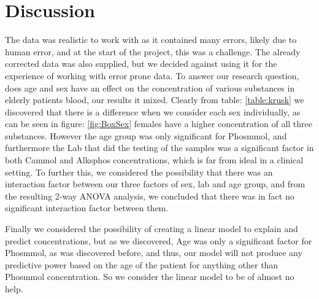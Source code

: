 \documentclass{article}
\begin{document}
  \section{Discussion}
    The data was realistic to work with as it contained many errors, likely due to human error, and at the start of the project, this was a challenge.
    The already corrected data was also supplied, but we decided against using it for the experience of working with error prone data.
    To answer our research question, does age and sex have an effect on the concentration of various substances in elderly patients blood, our results it mixed. Clearly from table: \ref{table:krusk} we discovered that there is a difference when we consider each sex individually, as can be seen in figure: \ref{fig:BoxSex} females have a higher concentration of all three substances. However the age group was only significant for Phosmmol, and furthermore the Lab that did the testing of the samples was a significant factor in both Cammol and Alksphos concentrations, which is far from ideal in a clinical setting. To further this, we considered the possibility that there was an interaction factor between our three factors of sex, lab and age group, and from the resulting 2-way ANOVA analysis, we concluded that there was in fact no significant interaction factor between them.
    
    Finally we considered the possibility of creating a linear model to explain and predict concentrations, but as we discovered, Age was only a significant factor for Phosmmol, as was discovered before, and thus, our model will not produce any predictive power based on the age of the patient for anything other than Phosmmol concentration. So we consider the linear model to be of almost no help.
    
\end{document}
